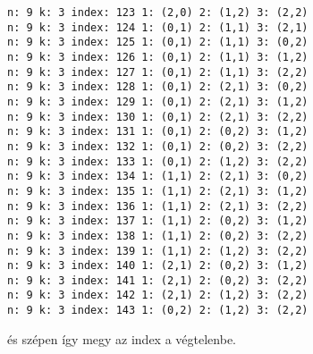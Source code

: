 \documentclass[a4paper]{article}
\theoremstyle{definition}
\begin{document}
\begin{lstlisting}[breaklines]
n: 9 k: 3 index: 123 1: (2,0) 2: (1,2) 3: (2,2)
n: 9 k: 3 index: 124 1: (0,1) 2: (1,1) 3: (2,1)
n: 9 k: 3 index: 125 1: (0,1) 2: (1,1) 3: (0,2)
n: 9 k: 3 index: 126 1: (0,1) 2: (1,1) 3: (1,2)
n: 9 k: 3 index: 127 1: (0,1) 2: (1,1) 3: (2,2)
n: 9 k: 3 index: 128 1: (0,1) 2: (2,1) 3: (0,2)
n: 9 k: 3 index: 129 1: (0,1) 2: (2,1) 3: (1,2)
n: 9 k: 3 index: 130 1: (0,1) 2: (2,1) 3: (2,2)
n: 9 k: 3 index: 131 1: (0,1) 2: (0,2) 3: (1,2)
n: 9 k: 3 index: 132 1: (0,1) 2: (0,2) 3: (2,2)
n: 9 k: 3 index: 133 1: (0,1) 2: (1,2) 3: (2,2)
n: 9 k: 3 index: 134 1: (1,1) 2: (2,1) 3: (0,2)
n: 9 k: 3 index: 135 1: (1,1) 2: (2,1) 3: (1,2)
n: 9 k: 3 index: 136 1: (1,1) 2: (2,1) 3: (2,2)
n: 9 k: 3 index: 137 1: (1,1) 2: (0,2) 3: (1,2)
n: 9 k: 3 index: 138 1: (1,1) 2: (0,2) 3: (2,2)
n: 9 k: 3 index: 139 1: (1,1) 2: (1,2) 3: (2,2)
n: 9 k: 3 index: 140 1: (2,1) 2: (0,2) 3: (1,2)
n: 9 k: 3 index: 141 1: (2,1) 2: (0,2) 3: (2,2)
n: 9 k: 3 index: 142 1: (2,1) 2: (1,2) 3: (2,2)
n: 9 k: 3 index: 143 1: (0,2) 2: (1,2) 3: (2,2)
\end{lstlisting}

és szépen így megy az index a végtelenbe.
\end{document}
